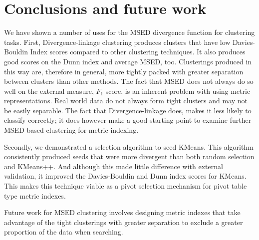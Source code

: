 \section{Conclusions and future work}
We have shown a number of uses for the MSED divergence function for clustering tasks.  First, Divergence-linkage clustering produces clusters that have low Davies-Bouldin Index scores compared to other clustering techniques. It also produces good scores on the Dunn index and average MSED, too.  Clusterings produced in this way are, therefore in general, more tightly packed with greater separation between clusters than other methods.  The fact that MSED does not always do so well on the external measure, $F_1$ score, is an inherent problem with using metric representations.  Real world data do not always form tight clusters and may not be easily separable.  The fact that Divergence-linkage does, makes it less likely to classify correctly; it does however make a good starting point to examine further MSED based clustering for metric indexing.

Secondly, we demonstrated a selection algorithm to seed KMeans.  This algorithm consistently produced seeds that were more divergent than both random selection and KMeans++.  And although this made little difference with external validation, it improved the Davies-Bouldin and Dunn index scores for KMeans.  This makes this technique viable as a pivot selection mechanism for pivot table type metric indexes.

Future work for MSED clustering involves designing metric indexes that take advantage of the tight clusterings with greater separation to exclude a greater proportion of the data when searching.

